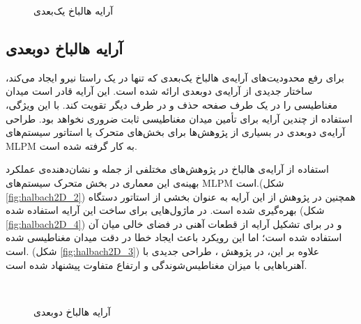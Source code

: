 \begin{figure}[ht]
\centering 
{}
%
\caption{آرایه هالباخ یک‌بعدی}
\label{fig:halbach1D} %
\end{figure}

\subsection{آرایه هالباخ دوبعدی}

برای رفع محدودیت‌های آرایه‌ی هالباخ یک‌بعدی که تنها در یک راستا نیرو ایجاد می‌کند، ساختار جدیدی از آرایه‌ی دوبعدی ارائه شده است. این آرایه قادر است میدان مغناطیسی را در یک طرف صفحه حذف و در طرف دیگر تقویت کند. با این ویژگی، استفاده از چندین آرایه برای تأمین میدان مغناطیسی ثابت ضروری نخواهد بود. طراحی آرایه‌ی دوبعدی در بسیاری از پژوهش‌ها برای بخش‌های متحرک یا استاتور سیستم‌های MLPM به کار گرفته شده است.

استفاده از آرایه‌ی هالباخ در پژوهش‌های مختلفی از جمله
\cite{RN10, RN30} 
و
\cite{RN55, RN26} 
نشان‌دهنده‌ی عملکرد بهینه‌ی این معماری در بخش متحرک سیستم‌های MLPM است.(شکل
\ref{fig:halbach2D_2})
 همچنین در پژوهش
\cite{RN14}
 از این آرایه به عنوان بخشی از استاتور دستگاه بهره‌گیری شده است. در 
\cite{RN61}
 ماژول‌هایی برای ساخت این آرایه استفاده شده (شکل
\ref{fig:halbach2D_4})
 و در
\cite{RN49}
 برای تشکیل آرایه از قطعات آهنی در فضای خالی میان آن استفاده شده است؛ اما این رویکرد باعث ایجاد خطا در دقت میدان مغناطیسی شده است. (شکل
\ref{fig:halbach2D_3})
علاوه بر این، در پژوهش
\cite{RN28}
، طراحی جدیدی با آهنرباهایی با میزان مغناطیس‌شوندگی و ارتفاع متفاوت پیشنهاد شده است.
\begin{figure}[ht]
\centering 
{}
\hspace{2mm}
\\ %
\caption{آرایه هالباخ دو‌بعدی}
\label{fig:halbach2D} %

\end{figure}
